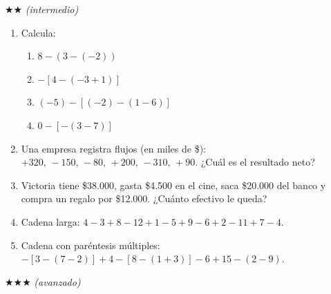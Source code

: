\documentclass[11pt, letterpaper]{article}
\begin{document}
$\bigstar\bigstar$ \textit{(intermedio)}

\begin{enumerate}[label=\textbf{\arabic*.}, leftmargin=*, resume]
  \item Calcula:
  \begin{multicols}{2}
  \begin{enumerate}[label=\alph*)]
    \item $8-(3-(-2))$
    \item $-[4-(-3+1)]$
    \item $(-5)-[(-2)-(1-6)]$
    \item $0-[-(3-7)]$
  \end{enumerate}
  \end{multicols}

  \item Una empresa registra flujos (en miles de \$): $+320,\,-150,\,-80,\,+200,\,-310,\,+90$. ¿Cu\'al es el resultado neto?
  \vspace{2.5cm}

  \item Victoria tiene \$38.000, gasta \$4.500 en el cine, saca \$20.000 del banco y compra un regalo por \$12.000. ¿Cu\'anto efectivo le queda?
  \vspace{2cm}

  \item Cadena larga: $4-3+8-12+1-5+9-6+2-11+7-4$.
  \vspace{2cm}

  \item Cadena con par\'entesis m\'ultiples: $-[3-(7-2)]+4-[8-(1+3)]-6+15-(2-9)$.
  \vspace{2.5cm}
\end{enumerate}

$\bigstar\bigstar\bigstar$ \textit{(avanzado)}
\end{document}
